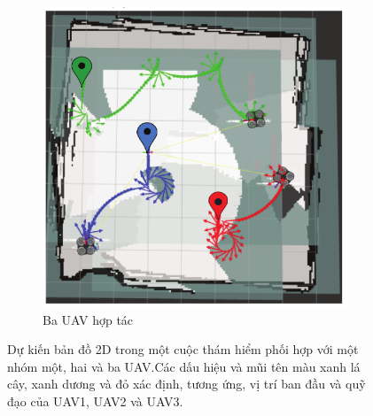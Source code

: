 \documentclass[11pt,openany]{book}
\begin{document}
\begin{algorimth}[H]
\begin{figure}[H]
\begin{subfigure}[H]{0.5\linewidth}
        \label{fig:3.16b}
    \end{subfigure}
    \begin{subfigure}[H]{0.5\linewidth}
        \includegraphics[chiều rộng=\linewidth]{assets/3_16_c.png}
        \caption{{Ba UAV hợp tác}}
        \label{fig:3.16c}
    \end{subfigure}
    \caption{Dự kiến bản đồ 2D trong một cuộc thám hiểm phối hợp với một nhóm một, hai và ba UAV.Các dấu hiệu và mũi tên màu xanh lá cây, xanh dương và đỏ xác định, tương ứng, vị trí ban đầu và quỹ đạo của UAV1, UAV2 và UAV3.}
    \label{fig:3.16}
\end{figure}

\end{algorimth}
\end{document}
